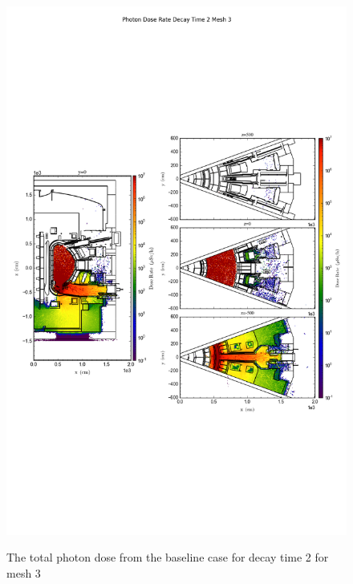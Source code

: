 \begin{figure}[ht!]
\centering
\includegraphics[trim={0cm 9cm 0cm 10cm},clip,scale=0.75]{../plots/final_model/Photon_Dose_Rate_Decay_Time_2_Mesh_3.png}
\label{fig:photons_dc2_no4bc_m3_flux}
\caption{The total photon dose from the baseline case for decay time 2 for mesh 3}
\end{figure}
